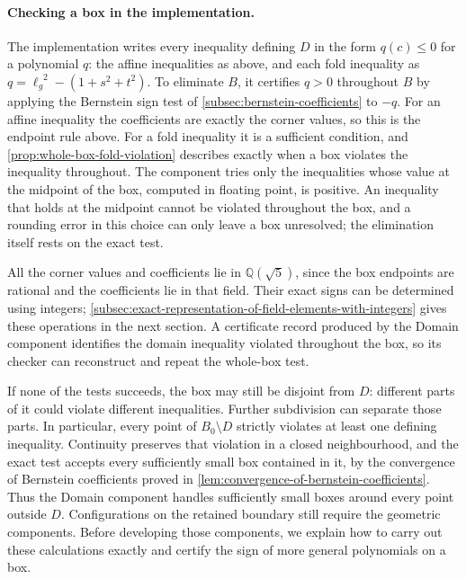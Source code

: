 \paragraph{Checking a box in the implementation.}
The implementation writes every inequality defining $D$ in the form
$q(c)\le0$ for a polynomial $q$: the affine inequalities as above, and
each fold inequality as $q={\ell_g}^2-(1+s^2+t^2)$. To eliminate $B$, it
certifies $q>0$ throughout $B$ by applying the Bernstein sign test of
\cref{subsec:bernstein-coefficients} to $-q$. For an affine inequality the
coefficients are exactly the corner values, so this is the endpoint rule
above. For a fold inequality it is a sufficient condition, and
\cref{prop:whole-box-fold-violation} describes exactly when a box violates
the inequality throughout. The component tries only the inequalities
whose value at the midpoint of the box, computed in floating point, is
positive. An inequality that holds at the midpoint cannot be violated
throughout the box, and a rounding error in this choice can only leave a
box unresolved; the elimination itself rests on the exact test.

All the corner values and coefficients lie in $\mathbb Q(\sqrt5)$, since
the box endpoints are rational and the coefficients lie in that field.
Their exact signs can be determined using integers;
\cref{subsec:exact-representation-of-field-elements-with-integers}
gives these operations in the next section.
A certificate record produced by the Domain component identifies the domain
inequality violated throughout the box, so its checker can reconstruct and
repeat the whole-box test.

If none of the tests succeeds, the box may still be disjoint from $D$:
different parts of it could violate different inequalities. Further
subdivision can separate those parts. In particular, every point of
$B_0\setminus D$ strictly violates at least one defining inequality.
Continuity preserves that violation in a closed neighbourhood, and the
exact test accepts every sufficiently small box contained in it, by the
convergence of Bernstein coefficients proved in
\cref{lem:convergence-of-bernstein-coefficients}. Thus the Domain
component handles sufficiently small boxes around every point outside $D$. Configurations on
the retained boundary still require the geometric components. Before
developing those components, we explain how to carry out these calculations
exactly and certify the sign of more general polynomials on a box.
